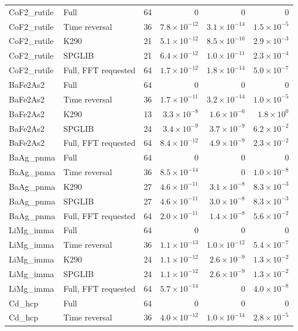 \begin{table}[htbp]
\begin{tabular}{llrrrr}
CoF2\_rutile & Full & 64 & $0$ & $0$ & $0$ \\
CoF2\_rutile & Time reversal & 36 & $7.8\times10^{-12}$ & $3.1\times10^{-14}$ & $1.5\times10^{-5}$ \\
CoF2\_rutile & K290 & 21 & $5.1\times10^{-12}$ & $8.5\times10^{-10}$ & $2.9\times10^{-3}$ \\
CoF2\_rutile & SPGLIB & 21 & $6.4\times10^{-12}$ & $1.0\times10^{-11}$ & $2.3\times10^{-4}$ \\
CoF2\_rutile & Full, FFT requested & 64 & $1.7\times10^{-12}$ & $1.8\times10^{-14}$ & $5.0\times10^{-7}$ \\
BaFe2As2 & Full & 64 & $0$ & $0$ & $0$ \\
BaFe2As2 & Time reversal & 36 & $1.7\times10^{-11}$ & $3.2\times10^{-14}$ & $1.0\times10^{-5}$ \\
BaFe2As2 & K290 & 13 & $3.3\times10^{-8}$ & $1.6\times10^{-6}$ & $1.8\times10^{0}$ \\
BaFe2As2 & SPGLIB & 24 & $3.4\times10^{-9}$ & $3.7\times10^{-9}$ & $6.2\times10^{-2}$ \\
BaFe2As2 & Full, FFT requested & 64 & $8.4\times10^{-12}$ & $4.9\times10^{-9}$ & $2.3\times10^{-2}$ \\
BaAg\_pnma & Full & 64 & $0$ & $0$ & $0$ \\
BaAg\_pnma & Time reversal & 36 & $8.5\times10^{-14}$ & $0$ & $1.0\times10^{-8}$ \\
BaAg\_pnma & K290 & 27 & $4.6\times10^{-11}$ & $3.1\times10^{-8}$ & $8.3\times10^{-3}$ \\
BaAg\_pnma & SPGLIB & 27 & $4.6\times10^{-11}$ & $3.0\times10^{-8}$ & $8.3\times10^{-3}$ \\
BaAg\_pnma & Full, FFT requested & 64 & $2.0\times10^{-11}$ & $1.4\times10^{-8}$ & $5.6\times10^{-2}$ \\
LiMg\_imma & Full & 64 & $0$ & $0$ & $0$ \\
LiMg\_imma & Time reversal & 36 & $1.1\times10^{-13}$ & $1.0\times10^{-12}$ & $5.4\times10^{-7}$ \\
LiMg\_imma & K290 & 24 & $1.1\times10^{-12}$ & $2.6\times10^{-9}$ & $1.3\times10^{-2}$ \\
LiMg\_imma & SPGLIB & 24 & $1.1\times10^{-12}$ & $2.6\times10^{-9}$ & $1.3\times10^{-2}$ \\
LiMg\_imma & Full, FFT requested & 64 & $5.7\times10^{-14}$ & $0$ & $4.0\times10^{-8}$ \\
Cd\_hcp & Full & 64 & $0$ & $0$ & $0$ \\
Cd\_hcp & Time reversal & 36 & $4.0\times10^{-12}$ & $1.0\times10^{-14}$ & $2.8\times10^{-5}$ \\

\end{tabular}
\end{table}
